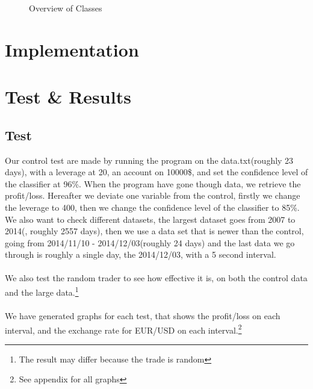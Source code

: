 \documentclass[10pt]{IEEEtran}
\begin{document}
\begin{figure}
\begin{center}
\end{center}
\caption{Overview of Classes}
\end{figure}

\section{Implementation}


\section{Test \& Results}
\subsection{Test}
Our control test are made by running the program on the data.txt(roughly 23 days), with a leverage at 20, an account on 10000\$, and set the confidence level of the classifier at 96\%. When the program have gone though data, we retrieve the profit/loss. Hereafter we deviate one variable from the control, firstly we change the leverage to 400, then we change the confidence level of the classifier to 85\%.\\
We also want to check different datasets, the largest dataset goes from 2007 to 2014(, roughly 2557 days), then we use a data set that is newer than the control, going from 2014/11/10 - 2014/12/03(roughly 24 days) and the last data we go through is roughly a single day, the 2014/12/03, with a 5 second interval.\\
\\
We also test the random trader to see how effective it is, on both the control data and the large data.\footnote{The result may differ because the trade is random}\\
\\
We have generated graphs for each test, that shows the profit/loss on each interval, and the exchange rate for EUR/USD on each interval.\footnote{See appendix for all graphs}
\end{document}
